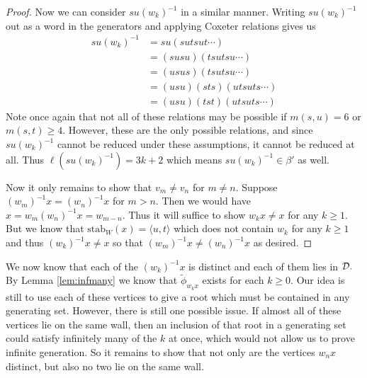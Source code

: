 \documentclass[class=book, crop=false,12 pt]{standalone}
\begin{document}
\begin{proof}
	Now we can consider $su(w_k)^{-1}$ in a similar manner. Writing $su(w_k)^{-1}$ out as a word in the generators and applying Coxeter relations gives us
\begin{align*}
	su(w_k)^{-1}&=su(sutsut\cdots)\\
	     &=(susu)(tsutsu\cdots)\\
	     &=(usus)(tsutsu\cdots)\\
	     &=(usu)(sts)(utsuts\cdots)\\
	     &=(usu)(tst)(utsuts\cdots)
\end{align*}
Note once again that not all of these relations may be possible if $m(s,u)=6$ or $m(s,t)\ge 4.$ However, these are the only possible relations, and since $su(w_k)^{-1}$ cannot be reduced under these assumptions, it cannot be reduced at all. Thus $\ell(su(w_k)^{-1})=3k+2$ which means $su(w_k)^{-1}\in \beta'$ as well.

Now it only remains to show that $v_m\neq v_n$ for $m\neq n.$ Suppose $(w_m)^{-1}x=(w_n)^{-1}x$ for $m>n.$ Then we would have $x=w_m(w_n)^{-1}x=w_{m-n}.$ Thus it will suffice to show $w_kx\neq x$ for any $k\ge 1.$ But we know that $\mathrm{stab}_{W}(x)=\langle u,t \rangle$ which does not contain $w_k$ for any $k\ge 1$ and thus $(w_k)^{-1}x\neq x$ so that $(w_m)^{-1}x\neq (w_n)^{-1}x$ as desired.

\end{proof}

We now know that each of the $(w_k)^{-1}x$ is distinct and each of them lies in $\mathcal{D}.$ By Lemma \ref{lem:infmany} we know that $\tilde{\phi}_{w_kx}$ exists for each $k\ge 0.$ Our idea is still to use each of these vertices to give a root which must be contained in any generating set. However, there is still one possible issue. If almost all of these vertices lie on the same wall, then an inclusion of that root in a generating set could satisfy infinitely many of the $k$ at once, which would not allow us to prove infinite generation. So it remains to show that not only are the vertices $w_nx$ distinct, but also no two lie on the same wall.
\end{document}
